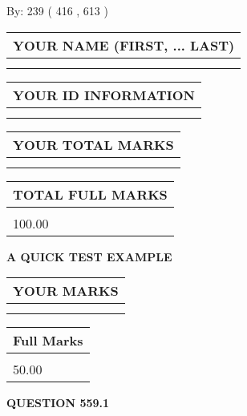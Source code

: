 \documentclass[12pt]{article}
\begin{document}
   
\hspace{1.0in} By: 
 239 ( 416 ,  613 )
   
   
   
   
\newpage 
\setcounter{page}{ 
   559001 } 
   
   
   
   
\noindent\begin{tabular}{|l|}
\hline
YOUR NAME (FIRST, ... LAST)  \\
\hline
 \\ 
 \\ 
\hline
\end{tabular}
\hspace{0.05in} \begin{tabular}{|l|}
\hline
 YOUR   ID   INFORMATION  \\
\hline
 \\ 
 \\ 
\hline
\end{tabular}
   
   
\vspace{0.2in}\noindent\begin{tabular}{|l|}
\hline
YOUR TOTAL MARKS  \\
\hline
 \\ 
 \\ 
\hline
\end{tabular}
\hspace{0.05in} \begin{tabular}{|l|}
\hline
TOTAL FULL MARKS  \\
\hline
 \\ 
100.00 \\
\hline
\end{tabular}
   
   
 \vspace{0.2in}
{\LARGE {\textbf{ A QUICK TEST EXAMPLE}}}
   
   
  
\vspace{0.2in}
  
\noindent\begin{tabular}{|l|}
\hline
 YOUR MARKS  \\
\hline
 \\ 
 \\ 
\hline
\end{tabular}
\hspace{0.05in} \begin{tabular}{|l|}
\hline
 Full Marks  \\
\hline
 \\ 
50.00 \\
\hline
\end{tabular}
{\textbf{\Large{QUESTION
559.1 
}}}
  
\end{document}
